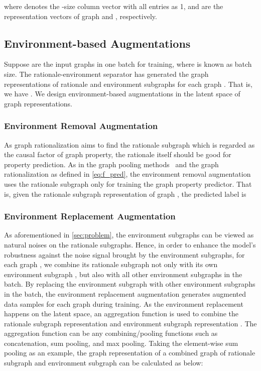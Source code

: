 \documentclass[sigconf]{acmart}
\begin{document}
where  denotes the -size column vector with all entries as 1, and  are the representation vectors of graph  and , respectively.

\subsection{Environment-based Augmentations}
\label{sec:env_aug}

Suppose  are the input graphs in one batch for training, where  is known as batch size.
The rationale-environment separator has generated the graph representations of rationale and environment subgraphs for each graph . That is, we have
. We design environment-based augmentations in the latent space of graph representations.

\subsubsection{Environment Removal Augmentation} 
As graph rationalization aims to find the rationale subgraph which is regarded as the causal factor of graph property, the rationale itself should be good for property prediction. As in the graph pooling methods~\cite{lee2019self,gao2021graph} and the graph rationalization as defined in \cref{eq:f_pred}, the environment removal augmentation uses the rationale subgraph only for training the graph property predictor. That is, given the rationale subgraph representation  of graph , the predicted label is


\subsubsection{Environment Replacement Augmentation}
As aforementioned in \cref{sec:problem}, the environment subgraphs can be viewed as natural noises on the rationale subgraphs. Hence, in order to enhance the model's robustness against the noise signal brought by the environment subgraphs, for each graph , we combine its rationale subgraph  not only with its own environment subgraph , but also with all other environment subgraphs  in the batch. By replacing the environment subgraph with other environment subgraphs in the batch, the environment replacement augmentation generates  augmented data samples for each graph during training. As the environment replacement happens on the latent space, an aggregation function  is used to combine the rationale subgraph representation  and environment subgraph representation . The aggregation function can be any combining/pooling functions such as concatenation, sum pooling, and max pooling. Taking the element-wise sum pooling as an example, the graph representation  of a combined graph of rationale subgraph  and environment subgraph  can be calculated as below:
\end{document}
